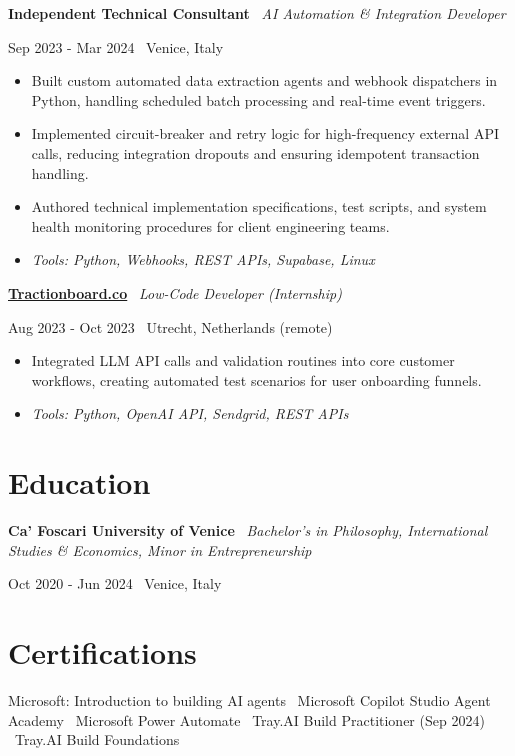 \documentclass[a4paper,10pt]{article}
\newcommand{\role}[4]{%
 \vspace{2pt}\noindent
 \begin{minipage}[t]{0.70\textwidth}\raggedright\textbf{#1} \textbullet\ \textit{#3}\end{minipage}%
 \hfill
 \begin{minipage}[t]{0.28\textwidth}\raggedleft\footnotesize\color{gray}#2 \textbullet\ #4\end{minipage}%
 \vspace{1pt}%
}
\begin{document}
\role{Independent Technical Consultant}{Sep 2023 - Mar 2024}{AI Automation \& Integration Developer}{Venice, Italy}
\begin{itemize}
 \item Built custom automated data extraction agents and webhook dispatchers in Python, handling scheduled batch processing and real-time event triggers.
 \item Implemented circuit-breaker and retry logic for high-frequency external API calls, reducing integration dropouts and ensuring idempotent transaction handling.
 \item Authored technical implementation specifications, test scripts, and system health monitoring procedures for client engineering teams.
 \item \textit{Tools: Python, Webhooks, REST APIs, Supabase, Linux}
\end{itemize}

\role{\href{https://tractionboard.co}{Tractionboard.co}}{Aug 2023 - Oct 2023}{Low-Code Developer (Internship)}{Utrecht, Netherlands (remote)}
\begin{itemize}
 \item Integrated LLM API calls and validation routines into core customer workflows, creating automated test scenarios for user onboarding funnels.
 \item \textit{Tools: Python, OpenAI API, Sendgrid, REST APIs}
\end{itemize}

\section{Education}
\role{Ca' Foscari University of Venice}{Oct 2020 - Jun 2024}{Bachelor's in Philosophy, International Studies \& Economics, Minor in Entrepreneurship}{Venice, Italy}

\section{Certifications}
Microsoft: Introduction to building AI agents \textbullet\ Microsoft Copilot Studio Agent Academy \textbullet\ Microsoft Power Automate \textbullet\ Tray.AI Build Practitioner (Sep 2024) \textbullet\ Tray.AI Build Foundations

\end{document}

